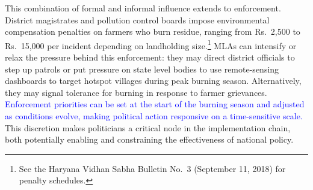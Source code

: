 \documentclass[12pt]{article}
\begin{document}
This combination of formal and informal influence extends to enforcement. District magistrates and pollution control boards impose environmental compensation penalties on farmers who burn residue, ranging from Rs.~2,500 to Rs.~15,000 per incident depending on landholding size.\footnote{See the Haryana Vidhan Sabha Bulletin No.\ 3 (September 11, 2018) for penalty schedules. } MLAs can intensify or relax the pressure behind this enforcement: they may direct district officials to step up patrols or put pressure on state level bodies to use remote-sensing dashboards to target hotspot villages during peak burning season. Alternatively, they may signal tolerance for burning in response to farmer grievances. \textcolor{blue}{Enforcement priorities can be set at the start of the burning season and adjusted as conditions evolve, making political action responsive on a time-sensitive scale.}
This discretion makes politicians a critical node in the implementation chain, both potentially enabling and constraining the effectiveness of national policy.
 
 
\end{document}
